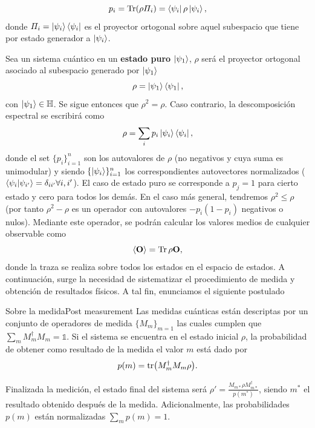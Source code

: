 \documentclass{report} %
\numberwithin{equation}{section}
\begin{document}
\begin{equation}
    p_i = \Tr (\rho \Pi_i) = \bra{\psi_i}\rho\ket{\psi_i},
\end{equation}
donde $\Pi_i = \ket{\psi_i}\bra{\psi_i}$ es el proyector ortogonal sobre aquel subespacio que tiene por estado generador a $\ket{\psi_i}$. 

Sea un sistema cuántico en un \textbf{estado puro} $\ket{\psi_1}$, $\rho$ será el proyector ortogonal asociado al subespacio generado por $\ket{\psi_1}$
\begin{equation}
    \rho = \ket{\psi_1}\bra{\psi_1},
\end{equation}
con $\ket{\psi_1} \in \mathbb{H}$. Se sigue entonces que $\rho^2 = \rho$. Caso contrario, la descomposición espectral se escribirá como
\begin{equation}
    \rho = \sum_{i}p_i \ket{\psi_i}\bra{\psi_i}, 
    \label{spectral_decomp}
\end{equation}
donde el set $\{p_i\}_{i=1}^{n}$ son los autovalores de $\rho$ (no negativos y cuya suma es unimodular) y siendo $\{\ket{\psi_i}\}_{i=1}^{n}$ los correspondientes autovectores normalizados ($\bra{\psi_i}\ket{\psi_{i'}} = \delta_{ii'} \forall i,i' $). El caso de estado puro se corresponde a $p_j = 1$ para cierto estado y cero para todos los demás. En el caso más general, tendremos $\rho^2 \leq \rho$ (por tanto $\rho^2 - \rho$ es un operador con autovalores $-p_i (1-p_i)$ negativos o nulos).
Mediante este operador, se podrán calcular los valores medios de cualquier observable como 
\begin{equation}
    \langle \mathbf{O} \rangle = \Tr \rho \mathbf{O},
\end{equation}
donde la traza se realiza sobre todos los estados en el espacio de estados. A continuación, surge la necesidad de sistematizar el procedimiento de medida y obtención de resultados físicos. A tal fin, enunciamos el siguiente postulado

\begin{post}{Sobre la medida}{Post 
measurement} 
\label{Post measurement}
Las medidas cuánticas están descriptas por un conjunto de operadores de medida $\{M_m\}_{m=1}$ las cuales cumplen que $\sum_{m} M_m^{\dagger}M_m = \mathds{1}$. Si el sistema se encuentra en el estado inicial $\rho$, la probabilidad de obtener como resultado de la medida el valor $m$ está dado por 
\begin{equation}
    p(m) = \tr (M_m^{\dagger}M_m \rho).
\end{equation}

Finalizada la medición, el estado final del sistema será  $\rho' = \frac{M_{m*} \rho M_{m*}^{\dagger}}{p(m^{*})}$, siendo $m^*$ el resultado obtenido después de la medida. Adicionalmente, las probabilidades $p(m)$ están normalizadas $\sum_m p(m) = 1$.
\end{post}
\end{document}
